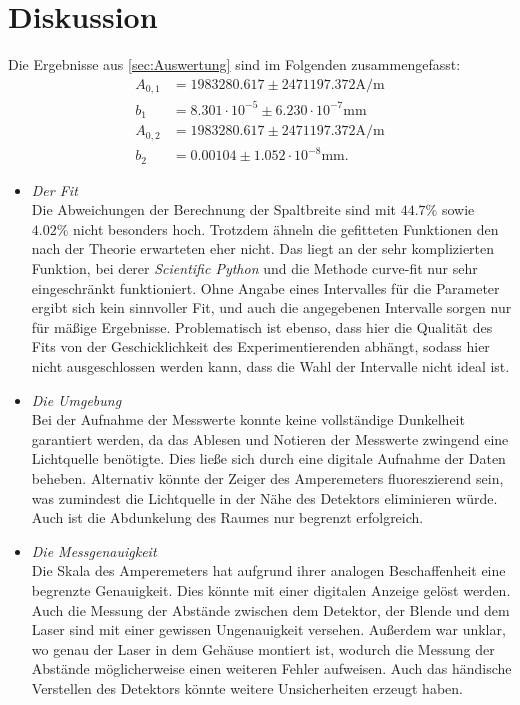 \section{Diskussion}
\label{sec:Diskussion}
Die Ergebnisse aus \ref{sec:Auswertung} sind im Folgenden zusammengefasst:
\begin{align*}
  A_{0,1} & = 1983280.617 \pm 2471197.372 \si{\ampere\per\meter}\\
  b_1     & = 8.301 \cdot 10^{-5} \pm 6.230 \cdot 10^{-7} \si{\milli\meter}\\
  A_{0,2} & =  1983280.617 \pm 2471197.372 \si{\ampere\per\meter}\\
  b_2     & = 0.00104 \pm 1.052 \cdot 10^{-8} \si{\milli\meter}.
\end{align*}

\begin{itemize}
  \item \textit{Der Fit} \\
    Die Abweichungen der Berechnung der Spaltbreite sind mit $44.7 \si{\percent}$
    sowie $4.02 \si{\percent}$ nicht besonders hoch. Trotzdem ähneln die gefitteten
    Funktionen den nach der Theorie erwarteten eher nicht. Das liegt an der sehr
    komplizierten Funktion, bei derer \textit{Scientific Python} und die Methode
    curve-fit nur sehr eingeschränkt funktioniert. Ohne Angabe eines
    Intervalles für die Parameter ergibt sich kein sinnvoller Fit, und auch die
    angegebenen Intervalle sorgen nur für mäßige Ergebnisse. Problematisch ist ebenso,
    dass hier die Qualität des Fits von der Geschicklichkeit des Experimentierenden
    abhängt, sodass hier nicht ausgeschlossen werden kann, dass die Wahl der Intervalle
    nicht ideal ist.

  \item \textit{Die Umgebung} \\
    Bei der Aufnahme der Messwerte konnte keine vollständige Dunkelheit garantiert
    werden, da das Ablesen und Notieren der Messwerte zwingend eine Lichtquelle
    benötigte. Dies ließe sich durch eine digitale Aufnahme der Daten beheben.
    Alternativ könnte der Zeiger des Amperemeters fluoreszierend sein, was zumindest
    die Lichtquelle in der Nähe des Detektors eliminieren würde. Auch ist die
    Abdunkelung des Raumes nur begrenzt erfolgreich.

  \item \textit{Die Messgenauigkeit} \\
    Die Skala des Amperemeters hat aufgrund ihrer analogen Beschaffenheit eine
    begrenzte Genauigkeit. Dies könnte mit einer digitalen Anzeige gelöst werden.
    Auch die Messung der Abstände zwischen dem Detektor, der Blende und dem Laser
    sind mit einer gewissen Ungenauigkeit versehen. Außerdem war unklar, wo genau
    der Laser in dem Gehäuse montiert ist, wodurch die Messung der Abstände
    möglicherweise einen weiteren Fehler aufweisen. Auch das händische Verstellen
    des Detektors könnte weitere Unsicherheiten erzeugt haben.


\end{itemize}
